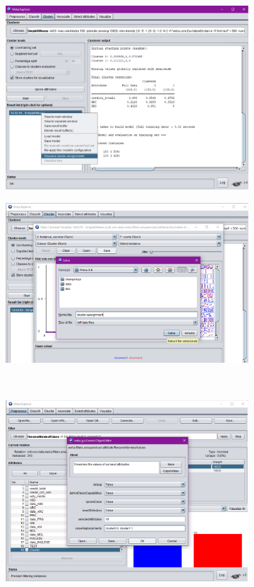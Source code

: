 \documentclass[12pt]{article}
\begin{document}
\begin{figure}
	\centering 
	\begin{subfigure}[b]{0.4\textwidth} 
	\includegraphics[width=\textwidth]{img/save-cluster-ass-1.pdf}
	\end{subfigure}
	\begin{subfigure}[b]{0.4\textwidth}
	\includegraphics[width=\textwidth]{img/save-cluster-ass-2.pdf}
	\end{subfigure}
	\\
	\begin{subfigure}[b]{0.4\textwidth}
	\includegraphics[width=\textwidth]{img/save-cluster-ass-3.pdf}

\end{subfigure}
\end{figure}
\end{document}
